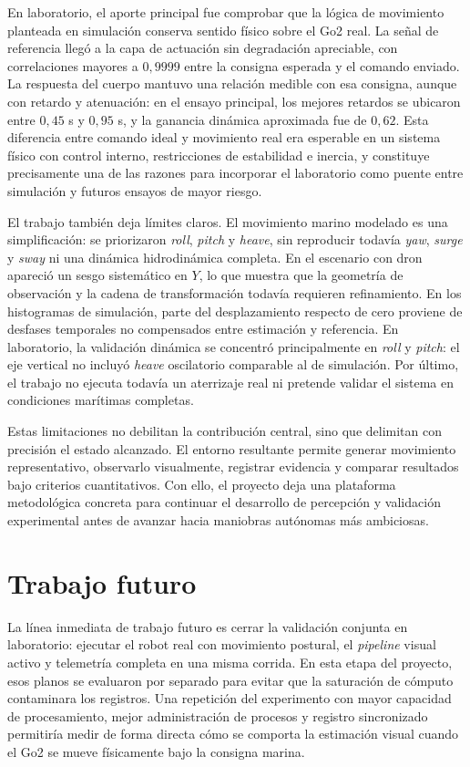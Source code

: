 \documentclass[12pt,a4paper]{report}
\begin{document}
En laboratorio, el aporte principal fue comprobar que la lógica de movimiento
planteada en simulación conserva sentido físico sobre el Go2 real. La señal de
referencia llegó a la capa de actuación sin degradación apreciable, con
correlaciones mayores a \(0{,}9999\) entre la consigna esperada y el comando
enviado. La respuesta del cuerpo mantuvo una relación medible con esa consigna,
aunque con retardo y atenuación: en el ensayo principal, los mejores retardos se
ubicaron entre \(0{,}45\) s y \(0{,}95\) s, y la ganancia dinámica aproximada fue
de \(0{,}62\). Esta diferencia entre comando ideal y movimiento real era
esperable en un sistema físico con control interno, restricciones de estabilidad
e inercia, y constituye precisamente una de las razones para incorporar el
laboratorio como puente entre simulación y futuros ensayos de mayor riesgo.

El trabajo también deja límites claros. El movimiento marino modelado es una
simplificación: se priorizaron \emph{roll}, \emph{pitch} y \emph{heave}, sin reproducir todavía \emph{yaw},
\emph{surge} y \emph{sway} ni una dinámica hidrodinámica completa. En el escenario con dron
apareció un sesgo sistemático en \(Y\), lo que muestra que la geometría de
observación y la cadena de transformación todavía requieren refinamiento. En los
histogramas de simulación, parte del desplazamiento respecto de cero proviene de
desfases temporales no compensados entre estimación y referencia. En
laboratorio, la validación dinámica se concentró principalmente en \emph{roll} y \emph{pitch}:
el eje vertical no incluyó \emph{heave} oscilatorio comparable al de simulación. Por
último, el trabajo no ejecuta todavía un aterrizaje real ni pretende validar el
sistema en condiciones marítimas completas.

Estas limitaciones no debilitan la contribución central, sino que delimitan con
precisión el estado alcanzado. El entorno resultante permite generar
movimiento representativo, observarlo visualmente, registrar evidencia y
comparar resultados bajo criterios cuantitativos. Con ello, el proyecto deja una
plataforma metodológica concreta para continuar el desarrollo de percepción y
validación experimental antes de avanzar hacia maniobras autónomas más
ambiciosas.



\chapter{Trabajo futuro}

La línea inmediata de trabajo futuro es cerrar la validación conjunta en
laboratorio: ejecutar el robot real con movimiento postural, el \textit{pipeline} visual
activo y telemetría completa en una misma corrida. En esta etapa del proyecto,
esos planos se evaluaron por separado para evitar que la saturación de cómputo
contaminara los registros. Una repetición del experimento con mayor capacidad de
procesamiento, mejor administración de procesos y registro sincronizado
permitiría medir de forma directa cómo se comporta la estimación visual cuando
el Go2 se mueve físicamente bajo la consigna marina.
\end{document}
